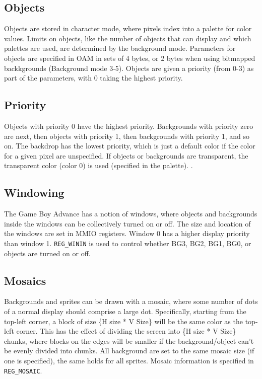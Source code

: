 \documentclass[11pt,a4paper]{article}
\begin{document}
	\subsection{Objects}
	Objects are stored in character mode, where pixels index into a palette for color values. Limits on objects, like the number of objects that can display and which palettes are used, are determined by the background mode. Parameters for objects are specified in OAM in sets of 4 bytes, or 2 bytes when using bitmapped backkgrounds (Background mode 3-5). Objects are given a priority (from 0-3) as part of the parameters, with 0 taking the highest priority. \cite{GBAManual}
	
	\subsection{Priority}
	Objects with priority 0 have the highest priority. Backgrounds with priority zero are next, then objects with priority 1, then backgrounds with priority 1, and so on. The backdrop has the lowest priority, which is just a default color if the color for a given pixel are unspecified. If objects or backgrounds are transparent, the transparent color (color 0) is used (specified in the palette). \cite{GBAManual}. 
	
	\subsection{Windowing}
	The Game Boy Advance has a notion of windows, where objects and backgrounds inside the windows can be collectively turned on or off. The size and location of the windows are set in MMIO registers. Window 0 has a higher display priority than window 1. \texttt{REG\_WININ} is used to control whether BG3, BG2, BG1, BG0, or objects are turned on or off. \cite{GBAManual}
	
	\subsection{Mosaics}
	Backgrounds and sprites can be drawn with a mosaic, where some number of dots of a normal display should comprise a large dot. Specifically, starting from the top-left corner, a block of size \{H size * V Size\} will be the same color as the top-left corner. This has the effect of dividing the screen into \{H size * V Size\} chunks, where blocks on the edges will be smaller if the background/object can't be evenly divided into chunks. All background are set to the same mosaic size (if one is specified), the same holds for all sprites. Mosaic information is specified in \texttt{REG\_MOSAIC}.\cite{GBAManual}
	
\end{document}

